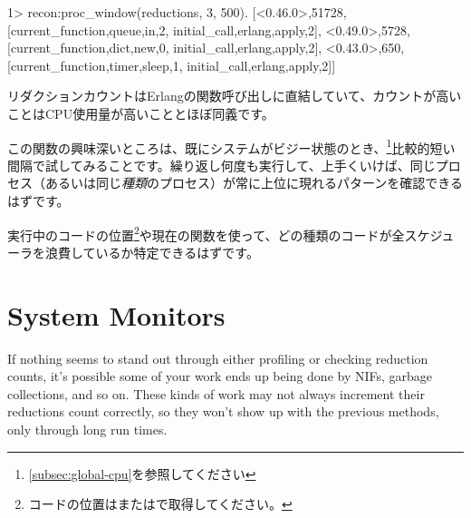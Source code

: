 \begin{VerbatimEshell}
1> recon:proc_window(reductions, 3, 500).
[{<0.46.0>,51728,
  [{current_function,{queue,in,2}},
   {initial_call,{erlang,apply,2}}]},
 {<0.49.0>,5728,
  [{current_function,{dict,new,0}},
   {initial_call,{erlang,apply,2}}]},
 {<0.43.0>,650,
  [{current_function,{timer,sleep,1}},
   {initial_call,{erlang,apply,2}}]}]
\end{VerbatimEshell}

リダクションカウントはErlangの関数呼び出しに直結していて、カウントが高いことはCPU使用量が高いこととほぼ同義です。

この関数の興味深いところは、既にシステムがビジー状態のとき、\footnote{\ref{subsec:global-cpu}を参照してください}比較的短い間隔で試してみることです。繰り返し何度も実行して、上手くいけば、同じプロセス（あるいは同じ\emph{種類}のプロセス）が常に上位に現れるパターンを確認できるはずです。

実行中のコードの位置\footnote{コードの位置はまたはで取得してください。}や現在の関数を使って、どの種類のコードが全スケジューラを浪費しているか特定できるはずです。

\section{System Monitors}
\label{sec:cpu-system-monitors}

If nothing seems to stand out through either profiling or checking reduction counts, it's possible some of your work ends up being done by NIFs, garbage collections, and so on. These kinds of work may not always increment their reductions count correctly, so they won't show up with the previous methods, only through long run times.

